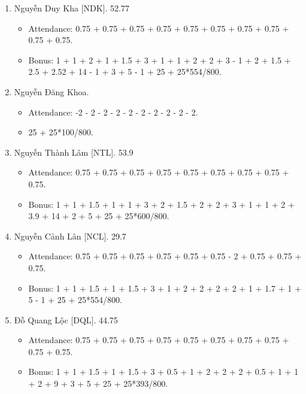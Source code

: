 \documentclass{article}
\begin{document}
\begin{enumerate}
    \begin{itemize}
        \item Attendance: 0.75 + 0.75 + 0.75 + 0.75 + 0.75 + 0.75 + 0.75 - 2 + 0.75.
        \item Bonus: 1 + 1 + 1.5 + 0.5 + 1.5 + 3 + 1 + 1 + 1 + 2 + 10 + 14 - 1 + 3 + 5 + 25 + 25*632/800.
    \end{itemize}
    \item {\sc Nguyễn Duy Kha [NDK].} 52.77
    \begin{itemize}
        \item Attendance: 0.75 + 0.75 + 0.75 + 0.75 + 0.75 + 0.75 + 0.75 + 0.75 + 0.75 + 0.75.
        \item Bonus: 1 + 1 + 2 + 1 + 1.5 + 3 + 1 + 1 + 2 + 2 + 3 - 1 + 2 + 1.5 + 2.5 + 2.52 + 14 - 1 + 3 + 5 - 1 + 25 + 25*554/800.
    \end{itemize}
    \item {\sc Nguyễn Đăng Khoa.}
	\begin{itemize}
		\item Attendance: -2 - 2 - 2 - 2 - 2 - 2 - 2 - 2 - 2 - 2.
		\item 25 + 25*100/800.
	\end{itemize}
    \item {\sc Nguyễn Thành Lâm [NTL].} 53.9
    \begin{itemize}
        \item Attendance: 0.75 + 0.75 + 0.75 + 0.75 + 0.75 + 0.75 + 0.75 + 0.75 + 0.75.
        \item Bonus: 1 + 1 + 1.5 + 1 + 1 + 3 + 2 + 1.5 + 2 + 2 + 3 + 1 + 1 + 2 + 3.9 + 14 + 2 + 5 + 25 + 25*600/800.
    \end{itemize}
    \item {\sc Nguyễn Cảnh Lân [NCL].} 29.7
    \begin{itemize}
        \item Attendance: 0.75 + 0.75 + 0.75 + 0.75 + 0.75 + 0.75 - 2 + 0.75 + 0.75 + 0.75.
        \item Bonus: 1 + 1 + 1.5 + 1 + 1.5 + 3 + 1 + 2 + 2 + 2 + 2 + 1 + 1.7 + 1 + 5 - 1 + 25 + 25*554/800.
    \end{itemize}
    \item {\sc Đỗ Quang Lộc [DQL].} 44.75
    \begin{itemize}
        \item Attendance: 0.75 + 0.75 + 0.75 + 0.75 + 0.75 + 0.75 + 0.75 + 0.75 + 0.75 + 0.75.
        \item Bonus: 1 + 1 + 1.5 + 1 + 1.5 + 3 + 0.5 + 1 + 2 + 2 + 2 + 0.5 + 1 + 1 + 2 + 9 + 3 + 5 + 25 + 25*393/800.

\end{itemize}
\end{enumerate}
\end{document}
